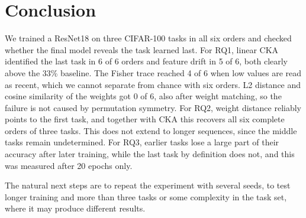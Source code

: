 \documentclass[11pt,a4paper]{article}
\begin{document}
\section{Conclusion}\label{sec:conclusion}

We trained a ResNet18 on three CIFAR-100 tasks in all six orders and checked whether the final model reveals the task learned last. For RQ1, linear CKA identified the last task in 6 of 6 orders and feature drift in 5 of 6, both clearly above the 33\% baseline. The Fisher trace reached 4 of 6 when low values are read as recent, which we cannot separate from chance with six orders. L2 distance and cosine similarity of the weights got 0 of 6, also after weight matching, so the failure is not caused by permutation symmetry. For RQ2, weight distance reliably points to the first task, and together with CKA this recovers all six complete orders of three tasks. This does not extend to longer sequences, since the middle tasks remain undetermined. For RQ3, earlier tasks lose a large part of their accuracy after later training, while the last task by definition does not, and this was measured after 20 epochs only.

The natural next steps are to repeat the experiment with several seeds, to test longer training and more than three tasks or some complexity in the task set, where it may produce different results.
\end{document}
